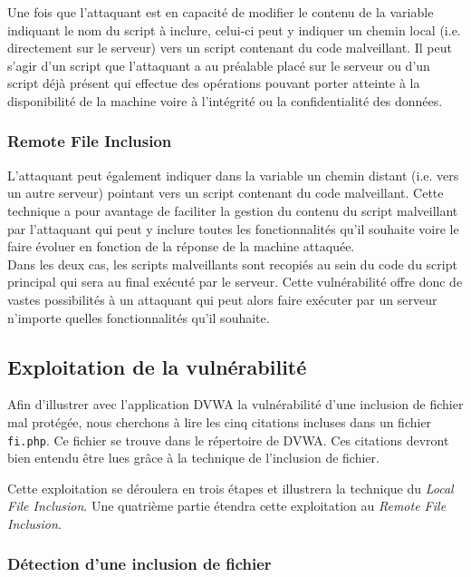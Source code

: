 Une fois que l'attaquant est en capacité de modifier le contenu de la variable indiquant le nom du script à inclure, celui-ci peut y indiquer un chemin local (i.e. directement sur le serveur) vers un script contenant du code malveillant. Il peut s'agir d'un script que l'attaquant a au préalable placé sur le serveur ou d'un script déjà présent qui effectue des opérations pouvant porter atteinte à la disponibilité de la machine voire à l'intégrité ou la confidentialité des données.

\subsubsection{Remote File Inclusion}

L'attaquant peut également indiquer dans la variable un chemin distant (i.e. vers un autre serveur) pointant vers un script contenant du code malveillant. Cette technique a pour avantage de faciliter la gestion du contenu du script malveillant par l'attaquant qui peut y inclure toutes les fonctionnalités qu'il souhaite voire le faire évoluer en fonction de la réponse de la machine attaquée.\\

Dans les deux cas, les scripts malveillants sont recopiés au sein du code du script principal qui sera au final exécuté par le serveur. Cette vulnérabilité offre donc de vastes possibilités à un attaquant qui peut alors faire exécuter par un serveur n'importe quelles fonctionnalités qu'il souhaite.

\subsection{Exploitation de la vulnérabilité}
\label{expl_fi}
Afin d'illustrer avec l'application DVWA la vulnérabilité d'une inclusion de fichier mal protégée, nous cherchons à lire les cinq citations incluses dans un fichier \texttt{fi.php}. Ce fichier se trouve dans le répertoire  de DVWA. Ces citations devront bien entendu être lues grâce à la technique de l'inclusion de fichier. 

Cette exploitation se déroulera en trois étapes et illustrera la technique du \textit{Local File Inclusion}. Une quatrième partie étendra cette exploitation au \textit{Remote File Inclusion}.

\subsubsection{Détection d'une inclusion de fichier}

